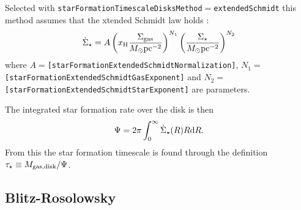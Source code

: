 Selected with {\tt starFormationTimescaleDisksMethod}$=${\tt extendedSchmidt} this method assumes that the xtended Schmidt law holds \citep{shi_extended_2011}:
\begin{equation}
\dot{\Sigma}_\star = A \left(x_{\rm H} {\Sigma_{\rm gas}\over M_\odot \hbox{pc}^{-2}}\right)^{N_1} \left({\Sigma_{\star}\over M_\odot \hbox{pc}^{-2}}\right)^{N_2}
\end{equation}
where $A=${\tt [starFormationExtendedSchmidtNormalization]}, $N_1=${\tt
[starFormationExtendedSchmidtGasExponent]} and $N_2=${\tt [starFormationExtendedSchmidtStarExponent]} are parameters. 

The integrated star formation rate over the disk is then
\begin{equation}
\Psi = 2 \pi \int_0^\infty \dot{\Sigma}_\star(R) R \d R.
\end{equation}
From this the star formation timescale is found through the definition $\tau_\star \equiv M_{\rm gas, disk}/\Psi$.

\subsection{Blitz-Rosolowsky}\label{sec:StarFormationBlitzRosolowsky}


